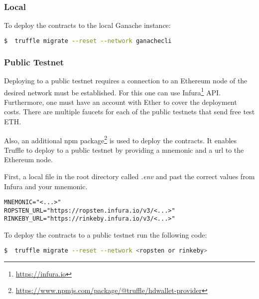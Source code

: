 \subsubsection{Local}

\noindent To deploy the contracts to the local Ganache instance:
\begin{lstlisting}[language=bash]
  $  truffle migrate --reset --network ganachecli
\end{lstlisting}

\subsubsection{Public Testnet}

Deploying to a public testnet requires a connection to an Ethereum node of the desired network must be established. For this one can use Infura\footnote{\url{https://infura.io}} API. Furthermore, one must have an account with Ether to cover the deployment costs. There are multiple faucets for each of the public testnets that send free test ETH. 

Also, an additional npm package\footnote{\url{https://www.npmjs.com/package/@truffle/hdwallet-provider}} is used to deploy the contracts. It enables Truffle to deploy to a public testnet by providing a mnemonic and a url to the Ethereum node.

First, a local file in the root directory called \textit{.env} and past the correct values from Infura and your mnemonic.

\begin{lstlisting}
MNEMONIC="<...>"
ROPSTEN_URL="https://ropsten.infura.io/v3/<...>"
RINKEBY_URL="https://rinkeby.infura.io/v3/<...>"
\end{lstlisting}

\noindent To deploy the contracts to a public testnet run the following code:
\begin{lstlisting}[language=bash]
  $  truffle migrate --reset --network <ropsten or rinkeby>
\end{lstlisting}
